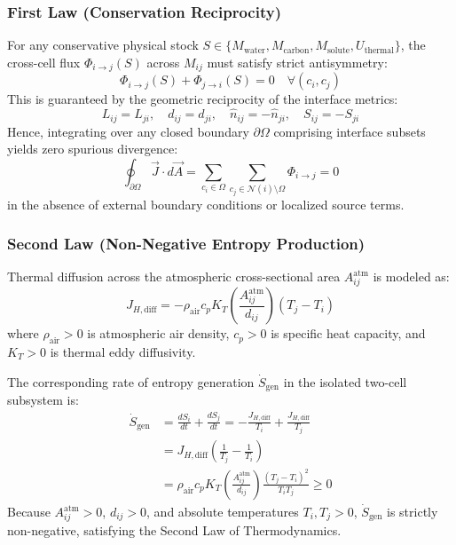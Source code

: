 \documentclass[10pt,journal,compsoc]{IEEEtran}
\begin{document}
\subsubsection{First Law (Conservation Reciprocity)}
For any conservative physical stock $S \in \{M_{\text{water}}, M_{\text{carbon}}, M_{\text{solute}}, U_{\text{thermal}}\}$, the cross-cell flux $\Phi_{i \to j}(S)$ across $M_{ij}$ must satisfy strict antisymmetry:
\begin{equation}
\Phi_{i \to j}(S) + \Phi_{j \to i}(S) = 0 \quad \forall (c_i, c_j)
\end{equation}
This is guaranteed by the geometric reciprocity of the interface metrics:
\begin{equation}
L_{ij} = L_{ji}, \quad d_{ij} = d_{ji}, \quad \hat{n}_{ij} = -\hat{n}_{ji}, \quad S_{ij} = -S_{ji}
\end{equation}
Hence, integrating over any closed boundary $\partial \Omega$ comprising interface subsets yields zero spurious divergence:
\begin{equation}
\oint_{\partial \Omega} \vec{J} \cdot d\vec{A} = \sum_{c_i \in \Omega} \sum_{c_j \in \mathcal{N}(i) \setminus \Omega} \Phi_{i \to j} = 0
\end{equation}
in the absence of external boundary conditions or localized source terms.

\subsubsection{Second Law (Non-Negative Entropy Production)}
Thermal diffusion across the atmospheric cross-sectional area $A_{ij}^{\text{atm}}$ is modeled as:
\begin{equation}
J_{H, \text{diff}} = - \rho_{\text{air}} c_p K_T \left( \frac{A_{ij}^{\text{atm}}}{d_{ij}} \right) (T_j - T_i)
\end{equation}
where $\rho_{\text{air}} > 0$ is atmospheric air density, $c_p > 0$ is specific heat capacity, and $K_T > 0$ is thermal eddy diffusivity.

The corresponding rate of entropy generation $\dot{S}_{\text{gen}}$ in the isolated two-cell subsystem is:
\begin{equation}
\begin{aligned}
\dot{S}_{\text{gen}} &= \frac{d S_i}{dt} + \frac{d S_j}{dt} = - \frac{J_{H, \text{diff}}}{T_i} + \frac{J_{H, \text{diff}}}{T_j} \\
&= J_{H, \text{diff}} \left( \frac{1}{T_j} - \frac{1}{T_i} \right) \\
&= \rho_{\text{air}} c_p K_T \left( \frac{A_{ij}^{\text{atm}}}{d_{ij}} \right) \frac{(T_j - T_i)^2}{T_i T_j} \ge 0
\end{aligned}
\end{equation}
Because $A_{ij}^{\text{atm}} > 0$, $d_{ij} > 0$, and absolute temperatures $T_i, T_j > 0$, $\dot{S}_{\text{gen}}$ is strictly non-negative, satisfying the Second Law of Thermodynamics.
\end{document}
